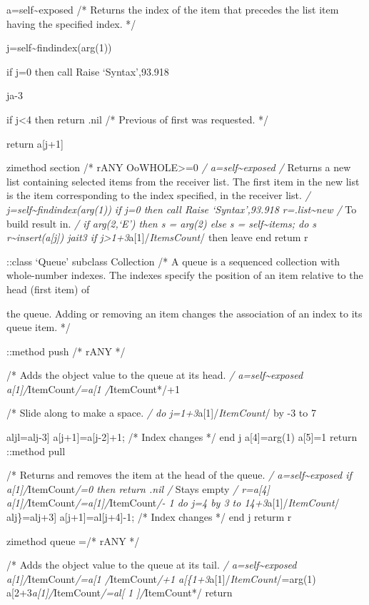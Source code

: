 a=self\textasciitilde exposed /* Returns the index of the item that
precedes the list item having the specified index. */

j=self\textasciitilde findindex(arg(1))

if j=0 then call Raise `Syntax',93.918

ja-3

if j\textless4 then return .nil /* Previous of first was requested. */

return a{[}j+1{]}

zimethod section /* rANY OoWHOLE\textgreater=0 \emph{/
a=self\textasciitilde exposed /} Returns a new list containing selected
items from the receiver list. The first item in the new list is the item
corresponding to the index specified, in the receiver list. \emph{/
j=self\textasciitilde findindex(arg(1)) if j=0 then call Raise
`Syntax',93.918 r=.list\textasciitilde new /} To build result in.
\emph{/ if arg(2,`E') then s = arg(2) else s =
self\textasciitilde items; do s r\textasciitilde insert(a{[}j{]}) jait3
if j\textgreater1+3}a{[}1{]}/\emph{ItemsCount}/ then leave end retum r

::class `Queue' subclass Collection /* A queue is a sequenced collection
with whole-number indexes. The indexes specify the position of an item
relative to the head (first item) of

the queue. Adding or removing an item changes the association of an
index to its queue item. */

::method push /* rANY */

/* Adds the object value to the queue at its head. \emph{/
a=self\textasciitilde exposed a{[}1{]}/}ItemCount\emph{/=a{[}1
\textbar/}ItemCount*/+1

/* Slide along to make a space. \emph{/ do
j=1+3}a{[}1{]}/\emph{ItemCount}/ by -3 to 7

aljl=alj-3{]} a{[}j+1{]}=a{[}j-2{]}+1; /* Index changes */ end j
a{[}4{]}=arg(1) a{[}5{]}=1 return ::method pull

/* Returns and removes the item at the head of the queue. \emph{/
a=self\textasciitilde exposed if a{[}1{]}/}ItemCount\emph{/=0 then
return .nil /} Stays empty \emph{/ r=a{[}4{]}
a{[}1{]}/}ItemCount\emph{/=a{[}1{]}/}ItemCount\emph{/- 1 do j=4 by 3 to
14+3}a{[}1{]}/\emph{ItemCount}/ alj\}=alj+3{]} a{[}j+1{]}=al{[}j+4{]}-1;
/* Index changes */ end j returm r

zimethod queue =/* rANY */

/* Adds the object value to the queue at its tail. \emph{/
a=self\textasciitilde exposed a{[}1{]}/}ItemCount\emph{/=a{[}1
\textbar/}ItemCount\emph{/+1
a{[}\{1+3}a{[}1{]}/\emph{ItemCount}/\textbar=arg(1)
a{[}2+3\emph{a{[}1{]}/}ItemCount\emph{/\textbar=al{[} 1 {]}/}ItemCount*/
return

